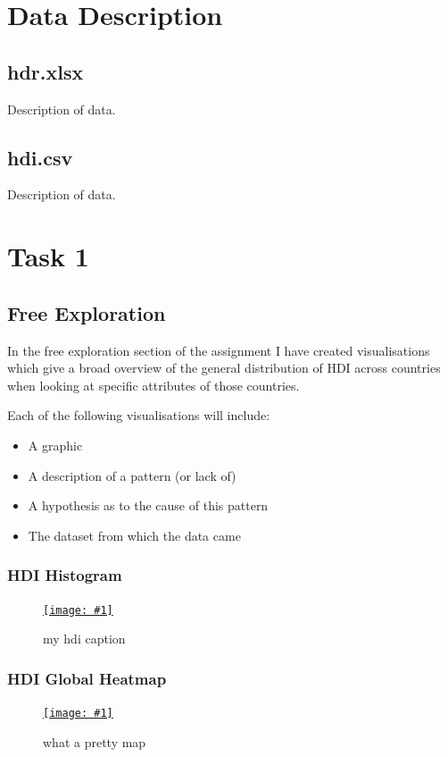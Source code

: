 \documentclass[11pt,a4paper,draft]{article}
\newcommand\onlinefig[3]{
\begin{figure}[H]
  \centering
  \href{#3}{\texttt{[image: \#1]}}
  \caption{#2} 
  \label{fig:#1}
\end{figure}
}
\begin{document}
\begin{multicols}{2}
\section{Data Description}
\subsection{hdr.xlsx}
Description of data.
\subsection{hdi.csv}
Description of data.


\section{Task 1}
\subsection{Free Exploration}
In the free exploration section of the assignment I have created visualisations which give a broad overview of the general distribution of HDI across countries when looking at specific attributes of those countries.

Each of the following visualisations will include:

\begin{itemize}
	\item A graphic
	\item A description of a pattern (or lack of)
	\item A hypothesis as to the cause of this pattern
	\item The dataset from which the data came
\end{itemize}

\subsubsection{HDI Histogram}
\onlinefig{hdi_histogram}{my hdi caption}{https://public.tableau.com/views/CS3205-HDI/Sheet6?:language=en-GB&:display_count=n&:origin=viz_share_link}

\subsubsection{HDI Global Heatmap}
\onlinefig{hdi_global_heatmap}{what a pretty map}{https://public.tableau.com/views/CS3205-HDI/Sheet3?:language=en-GB&:display_count=n&:origin=viz_share_link}


\end{multicols}
\end{document}
